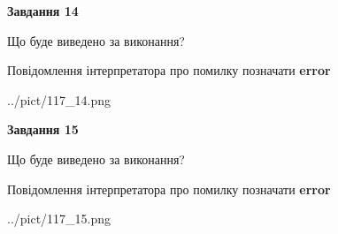 \documentclass[11pt, ukrainian]{article}
\begin{document}
{\begin {large}
{\begin {center}\textbf{Завдання 14}\end {center}}\par
Що буде виведено за виконання? \par
Повідомлення інтерпретатора про помилку позначати \textbf{error}

\begin{center}
	{../pict/117_14.png}
\end{center}
\newpage

{\begin {center}\textbf{Завдання 15}\end {center}}\par
Що буде виведено за виконання? \par
Повідомлення інтерпретатора про помилку позначати \textbf{error}

\begin{center}
	{../pict/117_15.png}
\end{center}
\newpage

\end {large}}
\end{document}
